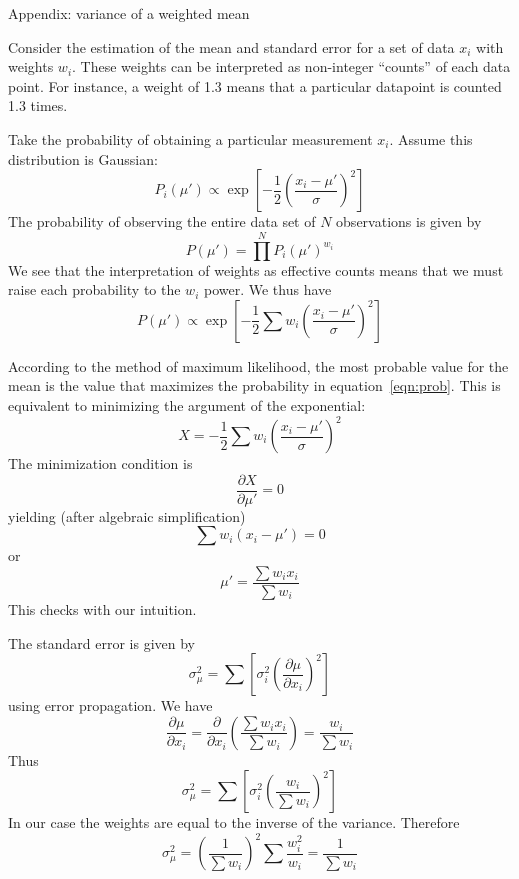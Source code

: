 \documentclass[12pt]{aastex}
\begin{document}
\begin{section}{Appendix: variance of a weighted mean}

Consider the estimation of the mean and standard error for a set of data $x_i$ with weights $w_i$.
These weights can
be interpreted as non-integer ``counts'' of each data point.  For instance, a weight of 1.3 means that a particular datapoint
is counted 1.3 times.

Take the probability of obtaining a particular measurement $x_i$.  Assume this distribution is Gaussian:
\begin{equation}
P_{i}(\mu') \propto \exp{[-\frac{1}{2}(\frac{x_i-\mu'}{\sigma})^2]}
\end{equation}
The probability of observing the entire data set of $N$ observations is given by
\begin{equation}
P(\mu') = \prod^{N}{P_i(\mu')^{w_i}}
\end{equation}
We see that the interpretation of weights as effective counts means that we must raise each probability to the $w_i$ power.
We thus have
\begin{equation}
P(\mu') \propto \exp{[-\frac{1}{2}\sum{w_i(\frac{x_i-\mu'}{\sigma})^2}]}
\label{eqn:prob}
\end{equation}

According to the method of maximum likelihood, the most probable value for the mean is the value that maximizes
the probability in equation~\ref{eqn:prob}.  This is equivalent to minimizing the argument of the exponential:
\begin{equation}
X = -\frac{1}{2}\sum{w_i(\frac{x_i-\mu'}{\sigma})^2}
\end{equation}
The minimization condition is
\begin{equation}
\frac{\partial X}{\partial \mu'} = 0
\end{equation}
yielding (after algebraic simplification)
\begin{equation}
\sum{w_i(x_i-\mu')} = 0
\end{equation}
or
\begin{equation}
\mu' =\frac{ \sum{w_i x_i}}{\sum{w_i}}
\end{equation}
This checks with our intuition.

The standard error is given by
\begin{equation}
\sigma_{\mu}^2 = \sum{[\sigma_i^2(\frac{\partial \mu}{\partial x_i})^2]}
\end{equation}
using error propagation.  We have
\begin{equation}
\frac{\partial \mu}{\partial x_i} = \frac{\partial}{\partial x_i}(\frac{\sum{w_i x_i}}{\sum{w_i}}) = \frac{w_i}{\sum{w_i}}
\end{equation}
Thus
\begin{equation}
\sigma_{\mu}^2 = \sum{[\sigma_i^2(\frac{w_i}{\sum{w_i}})^2]}
\end{equation}
In our case the weights are equal to the inverse of the variance.  Therefore
\begin{equation}
\sigma_{\mu}^2 = \left(\frac{1}{\sum w_i}\right)^2 \sum \frac{w_i^2}{w_i} = \frac{1}{\sum w_i}
\end{equation}

\end{section}
\end{document}
